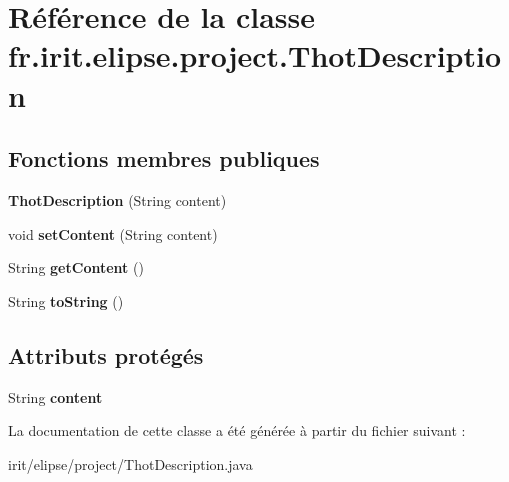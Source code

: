 \hypertarget{classfr_1_1irit_1_1elipse_1_1project_1_1_thot_description}{}\section{Référence de la classe fr.\+irit.\+elipse.\+project.\+Thot\+Description}
\label{classfr_1_1irit_1_1elipse_1_1project_1_1_thot_description}
\subsection*{Fonctions membres publiques}
\begin{DoxyCompactItemize}
\item 
\mbox{\label{classfr_1_1irit_1_1elipse_1_1project_1_1_thot_description_a1eb25b406977221bab04ed4f31057ead}} 
{\bfseries Thot\+Description} (String content)
\item 
\mbox{\label{classfr_1_1irit_1_1elipse_1_1project_1_1_thot_description_a9735bbca90d65b0203d36f72d073904c}} 
void {\bfseries set\+Content} (String content)
\item 
\mbox{\label{classfr_1_1irit_1_1elipse_1_1project_1_1_thot_description_a77112004fcbda07a612fc86a82a370af}} 
String {\bfseries get\+Content} ()
\item 
\mbox{\label{classfr_1_1irit_1_1elipse_1_1project_1_1_thot_description_ad28ba325fba49a6f03af59f8d811c504}} 
String {\bfseries to\+String} ()
\end{DoxyCompactItemize}
\subsection*{Attributs protégés}
\begin{DoxyCompactItemize}
\item 
\mbox{\label{classfr_1_1irit_1_1elipse_1_1project_1_1_thot_description_a147b51e1a572820951de2d038bf10c73}} 
String {\bfseries content}
\end{DoxyCompactItemize}


La documentation de cette classe a été générée à partir du fichier suivant \+:\begin{DoxyCompactItemize}
\item 
irit/elipse/project/Thot\+Description.\+java\end{DoxyCompactItemize}
